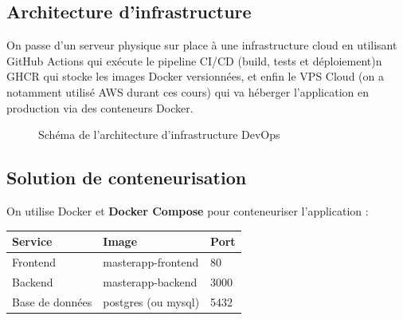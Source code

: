 \documentclass{article}
\begin{document}
\subsection{Architecture d'infrastructure}

On passe d'un serveur physique sur place à une infrastructure cloud en utilisant GitHub Actions qui exécute le pipeline CI/CD (build, tests et déploiement)n GHCR qui stocke les images Docker versionnées, et enfin le VPS Cloud (on a notamment utilisé AWS durant ces cours) qui va héberger l'application en production via des conteneurs Docker.

\begin{figure}[htbp]
\centering
{}
\caption{Schéma de l'architecture d'infrastructure DevOps}
\label{fig:architecture}
\end{figure}

\subsection{Solution de conteneurisation}

On utilise Docker et \textbf{Docker Compose} pour conteneuriser l'application :

\begin{tabularx}{\textwidth}{|l|X|l|}
\hline
\textbf{Service} & \textbf{Image} & \textbf{Port} \\
\hline
Frontend & masterapp-frontend & 80 \\
\hline
Backend & masterapp-backend & 3000 \\
\hline
Base de données & postgres (ou mysql) & 5432 \\
\hline
\end{tabularx}
\end{document}
